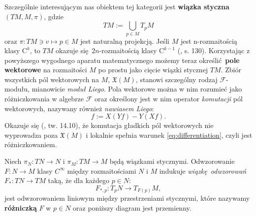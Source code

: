 Szczególnie interesującym nas obiektem tej kategorii jest \textbf{wiązka styczna} \((TM, M, \pi)\), gdzie 
\begin{equation*}
TM := \bigcup\limits_{p\in M} T_p M
\end{equation*}
oraz \(\pi: TM \ni v \mapsto p\in M\) jest naturalną projekcją. 
Jeśli \(M\) jest n-rozmaitością klasy \(\mathrm{C}^k\), to \(TM\) okazuje się \(2n\)-rozmaitością klasy \(\mathrm{C}^{k-1}\) (\cite{tu}, s. 130). 
Korzystając z powyższego wygodnego aparatu matematycznego możemy teraz określić \textbf{pole wektorowe} na rozmaitości \(M\) po prostu jako cięcie wiązki stycznej \(TM\). Zbiór wszystkich pól wektorowych na \(M\), \(\mathfrak{X}(M)\), stanowi szczególny rodzaj \(\mathcal{F}\)-modułu, mianowicie \emph{moduł Liego}. Pola wektorowe można w nim rozumieć jako różniczkowania w algebrze \(\mathcal{F}\) oraz określony jest w nim operator \emph{komutacji} pól wektorowych, nazywany również \emph{nawiasem Liego}:
\begin{equation*}
    [X, Y]f := X(Yf) - Y(Xf).
\end{equation*}
Okazuje się (\cite{tu}, tw. 14.10), że komutacja gładkich pól wektorowych nie wyprowadza poza \(\mathfrak{X}(M)\) i lokalnie spełnia warunek \eqref{eq:differentiation}, czyli jest różniczkowaniem.

Niech \(\pi_N: TN \to N\) i \(\pi_M: TM \to M\) będą wiązkami stycznymi. Odwzorowanie \(F:N\to M\) klasy \(C^\infty\) między rozmaitościami \(N\) i \(M\) indukuje \emph{wiązkę odwzorowań} \(F_\ast: TN\to TM\) taką, że dla każdego \(p\in N\):  
\begin{equation}
F_{\ast, p}:T_p N\rightarrow T_{F(p)}M, 
\end{equation}
jest odwzorowaniem liniowym między przestrzeniami stycznymi, które nazywamy \textbf{różniczką} \(F\) w \(p\in N\) oraz poniższy diagram jest przemienny. 
\begin{figure}[!h]
\centering
{}
\end{figure}


